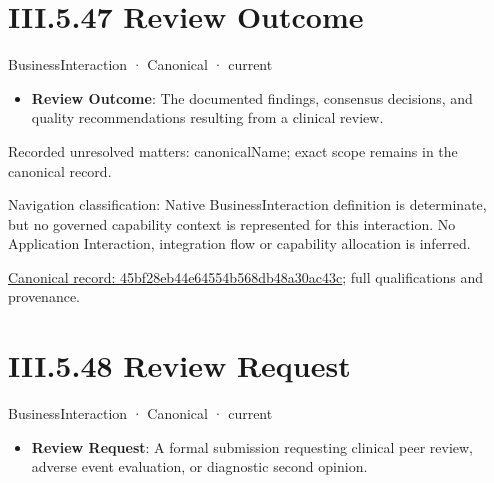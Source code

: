 \section*{III.5.47 Review Outcome}
\label{navigation:III.5.47}

\label{element:45bf28eb44e64554b568db48a30ac43c}
{\small BusinessInteraction · Canonical · current}\par

\begin{itemize}


\item \textbf{Review Outcome}: The documented findings, consensus decisions, and quality recommendations resulting from a clinical review.

\end{itemize}

{\small Recorded unresolved matters: canonicalName; exact scope remains in the canonical record.}\par
{\small Navigation classification: Native BusinessInteraction definition is determinate, but no governed capability context is represented for this interaction. No Application Interaction, integration flow or capability allocation is inferred.}\par
{\footnotesize \href{../../../../../../../../continuum/business/business-interaction/45bf28eb44e64554b568db48a30ac43c.md}{Canonical record: 45bf28eb44e64554b568db48a30ac43c}; full qualifications and provenance.}\par
\section*{III.5.48 Review Request}
\label{navigation:III.5.48}

\label{element:480556d544ad4dc18f6945f213044e9b}
{\small BusinessInteraction · Canonical · current}\par

\begin{itemize}


\item \textbf{Review Request}: A formal submission requesting clinical peer review, adverse event evaluation, or diagnostic second opinion.

\end{itemize}

